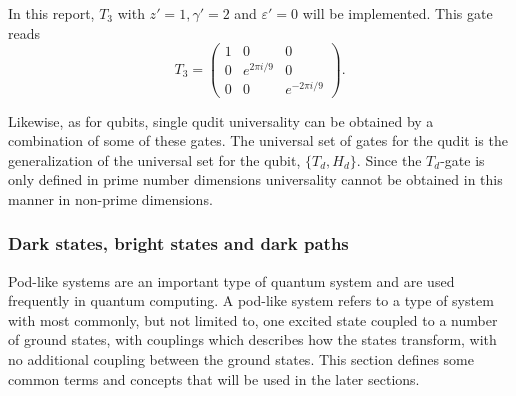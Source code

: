 In this report, $T_3$ with $z' = 1, \gamma' = 2$ and $\varepsilon' = 0$ will be implemented. This gate reads 
\begin{equation}
T_3 = \begin{pmatrix}
1 & 0 & 0\\
0 & e^{2\pi i/9}& 0 \\
0 & 0 & e^{-2\pi i /9}
\end{pmatrix}.
\end{equation}

Likewise, as for qubits, single qudit universality can be obtained by a combination of some of these gates. The universal set of gates for the qudit is the generalization of the universal set for the qubit, $\{T_d, H_d\}$. Since the $T_d$-gate is only defined in prime number dimensions universality cannot be obtained in this manner in non-prime dimensions.




\subsubsection{Dark states, bright states and dark paths}
Pod-like systems are an important type of quantum system and are used frequently in quantum computing. A pod-like system refers to a type of system with most commonly, but not limited to, one excited state coupled to a number of ground states, with couplings which describes how the states transform, with no additional coupling between the ground states. This section defines some common terms and concepts that will be used in the later sections.

